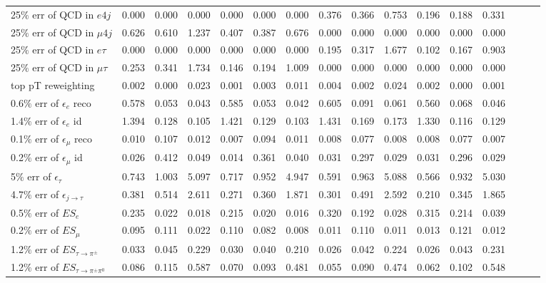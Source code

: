 \begin{sidewaystable}[p]
\begin{tabular}{|l|ccc|ccc|ccc|ccc|ccc|}
  25$\%$ err of QCD in $e 4j$                & 0.000 & 0.000 & 0.000 & 0.000 & 0.000 & 0.000 & 0.376 & 0.366 & 0.753 & 0.196 & 0.188 & 0.331 \\ 
  25$\%$ err of QCD in $\mu 4j$              & 0.626 & 0.610 & 1.237 & 0.407 & 0.387 & 0.676 & 0.000 & 0.000 & 0.000 & 0.000 & 0.000 & 0.000 \\ 
  25$\%$ err of QCD in $e\tau$               & 0.000 & 0.000 & 0.000 & 0.000 & 0.000 & 0.000 & 0.195 & 0.317 & 1.677 & 0.102 & 0.167 & 0.903 \\ 
  25$\%$ err of QCD in $\mu\tau$             & 0.253 & 0.341 & 1.734 & 0.146 & 0.194 & 1.009 & 0.000 & 0.000 & 0.000 & 0.000 & 0.000 & 0.000 \\ 
  top pT reweighting                         & 0.002 & 0.000 & 0.023 & 0.001 & 0.003 & 0.011 & 0.004 & 0.002 & 0.024 & 0.002 & 0.000 & 0.001 \\ 
  0.6$\%$ err of $\epsilon_e$ reco           & 0.578 & 0.053 & 0.043 & 0.585 & 0.053 & 0.042 & 0.605 & 0.091 & 0.061 & 0.560 & 0.068 & 0.046 \\ 
  1.4$\%$ err of $\epsilon_e$ id             & 1.394 & 0.128 & 0.105 & 1.421 & 0.129 & 0.103 & 1.431 & 0.169 & 0.173 & 1.330 & 0.116 & 0.129 \\ 
  0.1$\%$ err of $\epsilon_\mu$ reco         & 0.010 & 0.107 & 0.012 & 0.007 & 0.094 & 0.011 & 0.008 & 0.077 & 0.008 & 0.008 & 0.077 & 0.007 \\ 
  0.2$\%$ err of $\epsilon_\mu$ id           & 0.026 & 0.412 & 0.049 & 0.014 & 0.361 & 0.040 & 0.031 & 0.297 & 0.029 & 0.031 & 0.296 & 0.029 \\ 
  5$\%$ err of $\epsilon_\tau$               & 0.743 & 1.003 & 5.097 & 0.717 & 0.952 & 4.947 & 0.591 & 0.963 & 5.088 & 0.566 & 0.932 & 5.030 \\ 
  4.7$\%$ err of $\epsilon_{j\to\tau}$       & 0.381 & 0.514 & 2.611 & 0.271 & 0.360 & 1.871 & 0.301 & 0.491 & 2.592 & 0.210 & 0.345 & 1.865 \\ 
  0.5$\%$ err of $ES_{e}$                    & 0.235 & 0.022 & 0.018 & 0.215 & 0.020 & 0.016 & 0.320 & 0.192 & 0.028 & 0.315 & 0.214 & 0.039 \\ 
  0.2$\%$ err of $ES_{\mu}$                  & 0.095 & 0.111 & 0.022 & 0.110 & 0.082 & 0.008 & 0.011 & 0.110 & 0.011 & 0.013 & 0.121 & 0.012 \\ 
  1.2$\%$ err of $ES_{\tau\to\pi^\pm}$       & 0.033 & 0.045 & 0.229 & 0.030 & 0.040 & 0.210 & 0.026 & 0.042 & 0.224 & 0.026 & 0.043 & 0.231 \\ 
  1.2$\%$ err of $ES_{\tau\to\pi^\pm\pi^0}$  & 0.086 & 0.115 & 0.587 & 0.070 & 0.093 & 0.481 & 0.055 & 0.090 & 0.474 & 0.062 & 0.102 & 0.548 \\ 

\end{tabular}
\end{sidewaystable}
